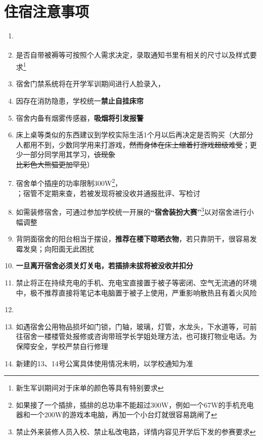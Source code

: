 \section[住宿注意事项]{住宿注意事项}
\begin{enumerate}
    \item \textbf{}
    \item 是否自带被褥等可按照个人需求决定，录取通知书里有相关的尺寸以及样式要求\footnote{新生军训期间对于床单的颜色等具有特别要求}
    \item 宿舍门禁系统将在开学军训期间进行人脸录入，\textbf{}
    \item 因存在消防隐患，学校统一\textbf{禁止自挂床帘}
    \item 宿舍内备有烟雾传感器，\textbf{吸烟将引发报警}
    \item 床上桌等类似的东西建议到学校实际生活1个月以后再决定是否购买（大部分人都用不到，少数同学用来打游戏，\sout{然而身体在床上缩着打游戏超级难受}；更少一部分同学用其学习，\sout{该现象\\比彩色大熊猫更加罕见}）
    \item 宿舍单个插座的功率限制300W\footnote{如果接了一个插排，插排的总功率不能超过300W，例如一个67W的手机充电器和一个200W的游戏本电脑，再加一个小台灯就很容易跳闸了}，\\；宿管不定期来查，若被发现将被没收并通报批评、写检讨
    \item 如需装修宿舍，可通过参加学校统一开展的\textbf{“宿舍装扮大赛”}\footnote{禁止外来装修人员入校、禁止私改电路，详情内容见开学后下发的参赛要求}以对宿舍进行小幅调整
    \item 背阴面宿舍的阳台相当于摆设，\textbf{推荐在楼下晾晒衣物}，若只靠阴干，很容易发霉发臭；向阳面无此困扰
    \item \textbf{一旦离开宿舍必须关灯关电，若插排未拔将被没收并扣分}
    \item 禁止将正在持续充电的手机、充电宝直接置于被子等密闭、空气无流通的环境中，极不推荐直接将笔记本电脑置于被子上使用，严重影响散热且有着火风险
    \item {}\\
    \item 如遇宿舍公用物品损坏如门锁，门轴，玻璃，灯管，水龙头，下水道等，可前往宿舍一楼楼管处报修或咨询带班学长学姐处理方法，也可拨打物业电话。为保障安全，学校严禁自行修理
    \item 新建的13、14号公寓具体使用情况未明，以学校通知为准
\end{enumerate}

